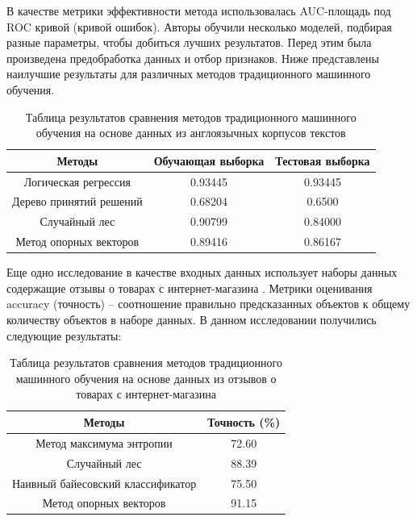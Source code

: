 \documentclass[a4paper,14pt, unknownkeysallowed]{extreport}
\begin{document}
	В качестве метрики эффективности метода использовалась AUC-площадь под ROC кривой (кривой ошибок). Авторы обучили несколько моделей, подбирая разные параметры, чтобы добиться лучших результатов. Перед этим была произведена предобработка данных и отбор признаков. Ниже представлены наилучшие результаты для различных методов традиционного машинного обучения.

	\begin{table}[H]
		\caption{Таблица результатов сравнения методов традиционного машинного обучения на основе данных из англоязычных корпусов текстов}
		
		\begin{center}
			
		\begin{tabular}{|c|c|c|}
			\hline
			Методы & Обучающая выборка & Тестовая выборка \\
			\hline
			Логическая регрессия & 0.93445 & 0.93445 \\
			\hline
			Дерево принятий решений & 0.68204 & 0.6500 \\
			\hline
			Случайный лес & 0.90799 & 0.84000 \\
			\hline
			Метод опорных векторов & 0.89416 & 0.86167 \\
			\hline
			
		\end{tabular}
			
		\end{center}
	\end{table}

	Еще одно исследование в качестве входных данных использует наборы данных содержащие отзывы о товарах с интернет-магазина \cite{Samigulin}. Метрики оценивания accuracy (точность) – соотношение правильно предсказанных объектов к общему количеству объектов в наборе данных. В данном исследовании получились следующие результаты:

	\begin{table}[H]
		\caption{Таблица результатов сравнения методов традиционного машинного обучения на основе данных из отзывов о товарах с интернет-магазина}
		
		\begin{center}
			
			\begin{tabular}{|c|c|}
				\hline
				Методы & Точность (\%) \\
				\hline
				Метод максимума энтропии & 72.60 \\
				\hline
				Случайный лес & 88.39 \\
				\hline
				Наивный байесовский классификатор & 75.50 \\
				\hline
				Метод опорных векторов & 91.15 \\
				\hline
				
			\end{tabular}
			
		\end{center}
	\end{table}
\end{document}
